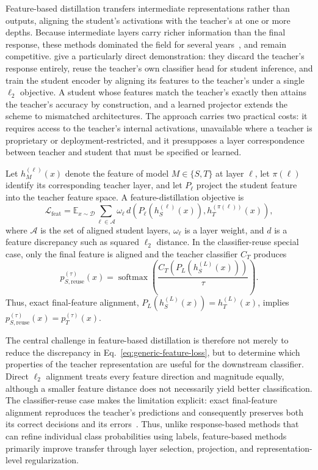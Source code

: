 \documentclass[review,number,sort&compress]{elsarticle}
\theoremstyle{definition}
\begin{document}
Feature-based distillation transfers intermediate representations rather than
outputs, aligning the student's activations with the teacher's at one or more
depths. Because intermediate layers carry richer information than the final
response, these methods dominated the field for several
years~\citep{chen2021review,zhao2022decoupled}, and remain competitive. \citet{chen2022reused} give a particularly direct demonstration: they discard
the teacher's response entirely, reuse the teacher's own classifier head for
student inference, and train the student encoder by aligning its features to the
teacher's under a single $\ell_2$ objective. A student whose features match the
teacher's exactly then attains the teacher's accuracy by construction, and a
learned projector extends the scheme to mismatched architectures. The approach
carries two practical costs: it requires access to the teacher's internal
activations, unavailable where a teacher is proprietary or
deployment-restricted, and it presupposes a layer
correspondence between teacher and student that must be specified or learned.

Let $h_M^{(\ell)}(x)$ denote the feature of model $M\in\{S,T\}$ at layer
$\ell$, let $\pi(\ell)$ identify its corresponding teacher layer, and let
$P_\ell$ project the student feature into the teacher feature space. A  feature-distillation objective is
\begin{equation}
\label{eq:generic-feature-loss}
\mathcal L_{\mathrm{feat}}
= \mathbb E_{x\sim\mathcal D}
\sum_{\ell\in\mathcal A}\omega_\ell\,
d\!\left(P_\ell(h_S^{(\ell)}(x)),
h_T^{(\pi(\ell))}(x)\right),
\end{equation}
where $\mathcal A$ is the set of aligned student layers, $\omega_\ell$ is a
layer weight, and $d$ is a feature discrepancy such as squared $\ell_2$
distance. In the classifier-reuse special case, only the final feature is
aligned and the teacher classifier $C_T$ produces
\begin{equation}
\label{eq:reused-classifier}
p_{S,\mathrm{reuse}}^{(\tau)}(x)
= \operatorname{softmax}\!\left(
\frac{C_T(P_L(h_S^{(L)}(x)))}{\tau}\right).
\end{equation}
Thus, exact final-feature alignment,
$P_L(h_S^{(L)}(x))=h_T^{(L)}(x)$, implies
$p_{S,\mathrm{reuse}}^{(\tau)}(x)=p_T^{(\tau)}(x)$.

The central challenge in feature-based distillation is therefore not merely to
reduce the discrepancy in Eq.~\eqref{eq:generic-feature-loss}, but to determine
which properties of the teacher representation are useful for the downstream
classifier. Direct $\ell_2$ alignment treats every feature direction and
magnitude equally, although a smaller feature distance does not necessarily
yield better classification. The
classifier-reuse case makes the limitation explicit: exact final-feature
alignment reproduces the teacher's predictions and consequently preserves both
its correct decisions and its errors~\citep{chen2022reused}. Thus, unlike
response-based methods that can refine individual class probabilities using
labels, feature-based methods primarily improve transfer through layer
selection, projection, and representation-level regularization.
\end{document}
